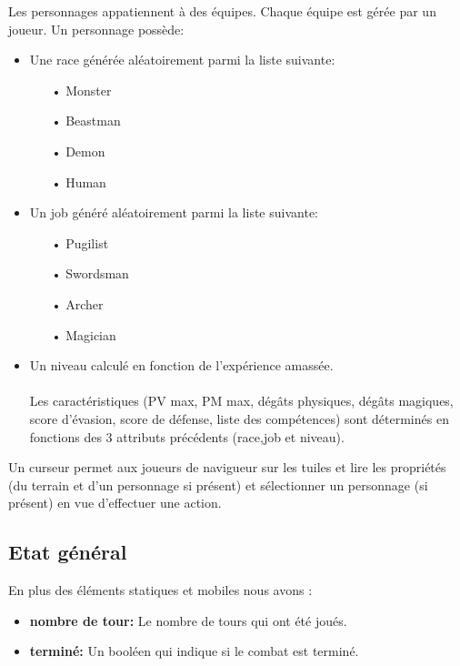 Les personnages appatiennent à des équipes. Chaque équipe est gérée par un joueur.  
Un personnage possède:
\\
\begin{itemize}
\item Une race générée aléatoirement parmi la liste suivante:
    \begin{itemize}
         \item[•]  Monster
         \item[•]  Beastman
         \item[•]  Demon
         \item[•]  Human
         \\
     \end{itemize}

\item Un job généré aléatoirement parmi la liste suivante:
    \begin{itemize}
         \item[•]  Pugilist
         \item[•]  Swordsman
         \item[•]  Archer
         \item[•]  Magician
         \\
     \end{itemize}
\item Un niveau calculé en fonction de l'expérience amassée.
\\ \\
Les caractéristiques (PV max, PM max, dégâts physiques, dégâts magiques, score d'évasion, score de défense, liste des compétences) sont déterminés en fonctions des 3 attributs précédents (race,job et niveau).
\\
\end{itemize}

Un curseur permet aux joueurs de navigueur sur les tuiles et lire les propriétés 
(du terrain et d'un personnage si présent) et sélectionner un personnage (si présent) en vue d'effectuer une action.


\subsection{Etat général}
En plus des éléments statiques et mobiles nous avons :
\begin{itemize}
         \item \textbf{nombre de tour:} Le nombre de tours qui ont été joués.
         \\
         \item \textbf{terminé:} Un booléen qui indique si le combat est terminé.
\end{itemize}


